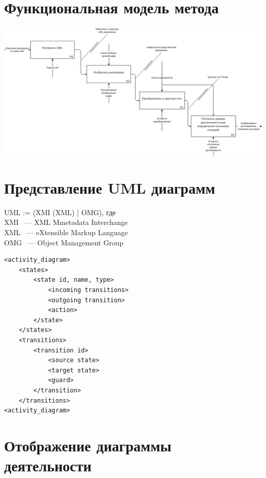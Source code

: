 \documentclass[12pt]{article}
\begin{document}
\section{Функциональная модель метода}

\begin{center}
\includegraphics[width=\textwidth]{../tex/include/IDEF0.png}
\end{center}

\section{Представление UML диаграмм }

\begin{minipage}[H]{0.48\linewidth}
UML := (XMI (XML) | OMG), где \\
XMI ~--- XML Mmetadata Interchange \\
XML ~--- eXtensible Markup Language \\
OMG ~--- Object Management Group

\end{minipage}
\hfill
\begin{minipage}[H]{0.55\linewidth}
	\begin{small}
		\begin{verbatim}
<activity_diagram>
    <states>
        <state id, name, type>
            <incoming transitions>
            <outgoing transition>
            <action>
        </state>
    </states>
    <transitions>
        <transition id>
            <source state>
            <target state>
            <guard>
        </transition>
    </transitions>
<activity_diagram>
		\end{verbatim}
	\end{small}
\end{minipage}

\section{Отображение диаграммы деятельности }
\end{document}
